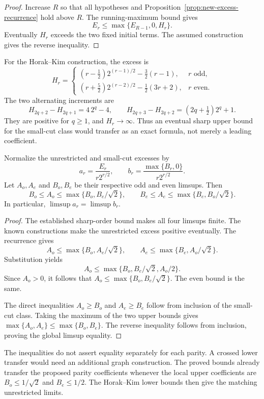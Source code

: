 \begin{proof}
Increase $R$ so that all hypotheses and Proposition~\ref{prop:new-excess-recurrence} hold above $R$.
The running-maximum bound gives
\[
 E_r\le\max\{E_{R-1},0,H_r\}.
\]
Eventually $H_r$ exceeds the two fixed initial terms.
The assumed construction gives the reverse inequality.
\end{proof}

For the Horak--Kim construction, the excess is
\[
 H_r=
 \begin{cases}
 (r-\tfrac12)2^{(r-1)/2}-\tfrac32(r-1),&r\text{ odd},\\[1mm]
 (r+\tfrac52)2^{(r-2)/2}-\tfrac12(3r+2),&r\text{ even}.
 \end{cases}
\]
The two alternating increments are
\[
 H_{2q+2}-H_{2q+1}=4\,2^q-4,
 \qquad
 H_{2q+3}-H_{2q+2}=(2q+\tfrac12)2^q+1.
\]
They are positive for $q\ge1$, and $H_r\to\infty$.
Thus an eventual sharp upper bound for the small-cut class would transfer as an exact formula, not merely a leading coefficient.

\begin{proposition}
\label{prop:new-parity-limsup}
Normalize the unrestricted and small-cut excesses by
\[
 a_r=\frac{E_r}{r2^{r/2}},\qquad
 b_r=\frac{\max\{B_r,0\}}{r2^{r/2}}.
\]
Let $A_o,A_e$ and $B_o,B_e$ be their respective odd and even limsups.
Then
\[
 B_o\le A_o\le\max\{B_o,B_e/\sqrt2\},
 \qquad
 B_e\le A_e\le\max\{B_e,B_o/\sqrt2\}.
\]
In particular, $\limsup a_r=\limsup b_r$.
\end{proposition}

\begin{proof}
The established sharp-order bound makes all four limsups finite.
The known constructions make the unrestricted excess positive eventually.
The recurrence gives
\[
 A_o\le\max\{B_o,A_e/\sqrt2\},
 \qquad
 A_e\le\max\{B_e,A_o/\sqrt2\}.
\]
Substitution yields
\[
 A_o\le\max\{B_o,B_e/\sqrt2,A_o/2\}.
\]
Since $A_o>0$, it follows that $A_o\le\max\{B_o,B_e/\sqrt2\}$.
The even bound is the same.

The direct inequalities $A_o\ge B_o$ and $A_e\ge B_e$ follow from inclusion of the small-cut class.
Taking the maximum of the two upper bounds gives
$\max\{A_o,A_e\}\le\max\{B_o,B_e\}$.
The reverse inequality follows from inclusion, proving the global limsup equality.
\end{proof}

The inequalities do not assert equality separately for each parity.
A crossed lower transfer would need an additional graph construction.
The proved bounds already transfer the proposed parity coefficients whenever the local upper coefficients are $B_o\le1/\sqrt2$ and $B_e\le1/2$.
The Horak--Kim lower bounds then give the matching unrestricted limits.
